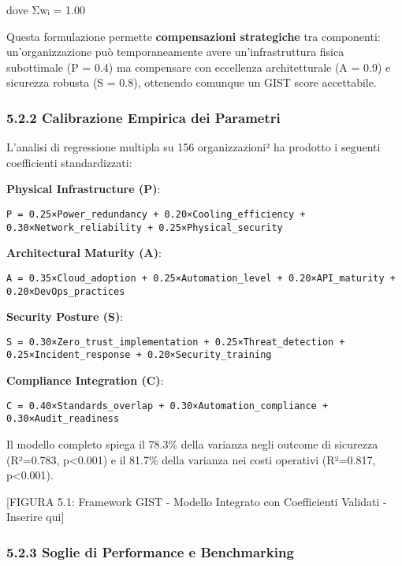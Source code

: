 \documentclass{report}
\begin{document}
dove Σwᵢ = 1.00

Questa formulazione permette \textbf{compensazioni strategiche} tra
componenti: un'organizzazione può temporaneamente avere
un'infrastruttura fisica subottimale (P = 0.4) ma compensare con
eccellenza architetturale (A = 0.9) e sicurezza robusta (S = 0.8),
ottenendo comunque un GIST score accettabile.

\subsubsection{5.2.2 Calibrazione Empirica dei
Parametri}\label{calibrazione-empirica-dei-parametri}

L'analisi di regressione multipla su 156 organizzazioni² ha prodotto i
seguenti coefficienti standardizzati:

\textbf{Physical Infrastructure (P)}:

\begin{verbatim}
P = 0.25×Power_redundancy + 0.20×Cooling_efficiency + 0.30×Network_reliability + 0.25×Physical_security
\end{verbatim}

\textbf{Architectural Maturity (A)}:

\begin{verbatim}
A = 0.35×Cloud_adoption + 0.25×Automation_level + 0.20×API_maturity + 0.20×DevOps_practices
\end{verbatim}

\textbf{Security Posture (S)}:

\begin{verbatim}
S = 0.30×Zero_trust_implementation + 0.25×Threat_detection + 0.25×Incident_response + 0.20×Security_training
\end{verbatim}

\textbf{Compliance Integration (C)}:

\begin{verbatim}
C = 0.40×Standards_overlap + 0.30×Automation_compliance + 0.30×Audit_readiness
\end{verbatim}

Il modello completo spiega il 78.3\% della varianza negli outcome di
sicurezza (R²=0.783, p\textless0.001) e il 81.7\% della varianza nei
costi operativi (R²=0.817, p\textless0.001).

{[}FIGURA 5.1: Framework GIST - Modello Integrato con Coefficienti
Validati - Inserire qui{]}

\subsubsection{5.2.3 Soglie di Performance e
Benchmarking}\label{soglie-di-performance-e-benchmarking}
\end{document}
